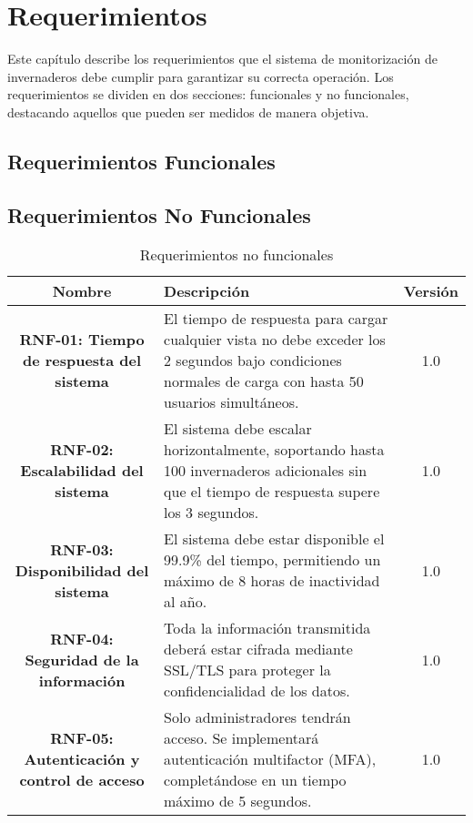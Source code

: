 \documentclass[12pt]{report}
\begin{document}
\chapter{Requerimientos}

Este capítulo describe los requerimientos que el sistema de monitorización de invernaderos debe cumplir para garantizar su correcta operación. Los requerimientos se dividen en dos secciones: funcionales y no funcionales, destacando aquellos que pueden ser medidos de manera objetiva.

\section{Requerimientos Funcionales}


\section{Requerimientos No Funcionales}

\begin{table}
\centering
\begin{tabularx}{\textwidth}{|c|X|c|}
\hline
\textbf{Nombre} & \textbf{Descripción} & \textbf{Versión} \\ \hline
\textbf{RNF-01: Tiempo de respuesta del sistema} & El tiempo de respuesta para cargar cualquier vista no debe exceder los 2 segundos bajo condiciones normales de carga con hasta 50 usuarios simultáneos. & 1.0 \\ \hline
\textbf{RNF-02: Escalabilidad del sistema} & El sistema debe escalar horizontalmente, soportando hasta 100 invernaderos adicionales sin que el tiempo de respuesta supere los 3 segundos. & 1.0 \\ \hline
\textbf{RNF-03: Disponibilidad del sistema} & El sistema debe estar disponible el 99.9\% del tiempo, permitiendo un máximo de 8 horas de inactividad al año. & 1.0 \\ \hline
\textbf{RNF-04: Seguridad de la información} & Toda la información transmitida deberá estar cifrada mediante SSL/TLS para proteger la confidencialidad de los datos. & 1.0 \\ \hline
\textbf{RNF-05: Autenticación y control de acceso} & Solo administradores tendrán acceso. Se implementará autenticación multifactor (MFA), completándose en un tiempo máximo de 5 segundos. & 1.0 \\ \hline
\end{tabularx}
\caption{Requerimientos no funcionales}
\end{table}






\end{document}
